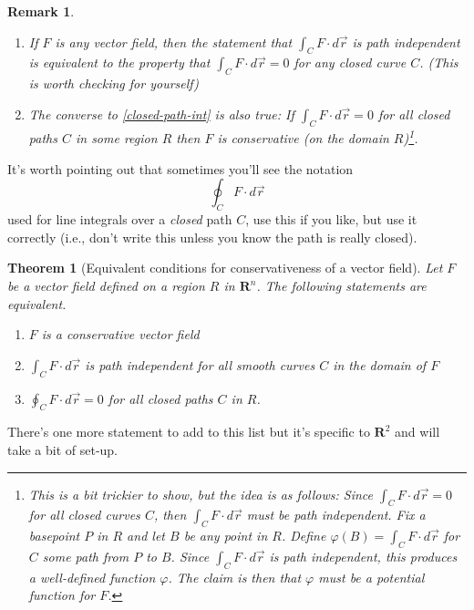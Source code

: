 \documentclass[12pt]{article}
\numberwithin{equation}{subsection}
\numberwithin{figure}{subsection}
\newtheorem{thm}[subsection]{Theorem}
\theoremstyle{note}
\newtheorem{remark}[subsection]{Remark}
\begin{document}
{\begin{remark}
\begin{enumerate}[label=\roman*.]
	\item If $F$ is \textit{any} vector field, then the statement that $\int_C F\cdot d\vec{r}$ is path independent is equivalent to the property that $\int_C F\cdot d\vec{r}=0$ for any closed curve $C$. (This is worth checking for yourself)
	
	\item The converse to \ref{closed-path-int} is also true: If $\int_C F\cdot d\vec{r}=0$ for \textit{all} closed paths $C$ in some region $R$ then $F$ is conservative (on the domain $R$)\footnote{This is a bit trickier to show, but the idea is as follows: Since $\int_C F\cdot d\vec{r}=0$ for all closed curves $C$, then $\int_C F\cdot d\vec{r}$ must be path independent. Fix a basepoint $P$ in $R$ and let $B$ be any point in $R$. Define $\varphi(B)=\int_C F\cdot d\vec{r}$ for $C$ some path from $P$ to $B$. Since $\int_C F\cdot d\vec{r}$ is path independent, this produces a well-defined function $\varphi$. The claim is then that $\varphi$ must be a potential function for $F$.}.
	

\end{enumerate}
\end{remark}

It's worth pointing out that sometimes you'll see the notation \[\oint_C F\cdot d\vec{r}\] used for line integrals over a \textit{closed} path $C$, use this if you like, but use it correctly (i.e., don't write this unless you know the path is really closed).



\begin{thm}[Equivalent conditions for conservativeness of a vector field] Let $F$ be a vector field defined on a region $R$ in $\mathbf{R}^n$. The following statements are equivalent.
\begin{enumerate}[label=(\arabic*)]
	\item $F$ is a conservative vector field
	\item $\displaystyle \int_C F\cdot d\vec{r}$ is path independent for all smooth curves $C$ in the domain of $F$
	\item $\displaystyle \oint_C F\cdot d\vec{r}=0$ for all closed paths $C$ in $R$. 	
\end{enumerate}
\end{thm}
There's one more statement to add to this list but it's specific to $\mathbf{R}^2$ and will take a bit of set-up. 

}
\end{document}
